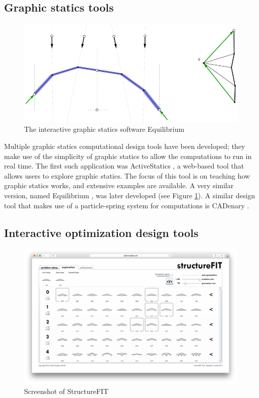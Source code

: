 \subsection{Graphic statics tools}

\begin{figure}
  \includegraphics[width=330pt]{graphics/equilibrium.png}
  \caption{The interactive graphic statics software Equilibrium \cite{Block}}
  \label{fig:equilibrium}
\end{figure}

Multiple graphic statics computational design tools have been developed; they make use of the simplicity of graphic statics to allow the computations to run in real time. The first such application was ActiveStatics \cite{ActiveStatics}, a web-based tool that allows users to explore graphic statics. The focus of this tool is on teaching how graphic statics works, and extensive examples are available. A very similar version, named Equilibrium \cite{Block}, was later developed (see Figure \ref{fig:equilibrium}). A similar design tool that makes use of a particle-spring system for computations is CADenary \cite{CADenary}.

\subsection{Interactive optimization design tools}

\begin{figure}
  \includegraphics[width=350pt]{graphics/structurefit.png}
  \caption{Screenshot of StructureFIT}
  \label{fig:structurefit}
\end{figure}

